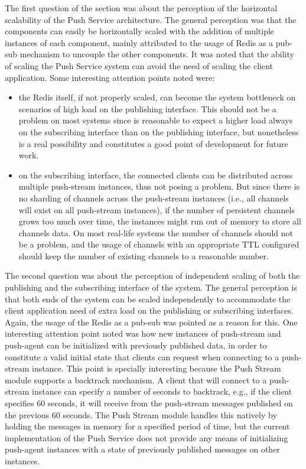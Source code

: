 The first question of the section was about the perception of the horizontal scalability of the Push Service architecture. The general perception was that the components can easily be horizontally scaled with the addition of multiple instances of each component, mainly attributed to the usage of Redis as a pub-sub mechanism to uncouple the other components. It was noted that the ability of scaling the Push Service system can avoid the need of scaling the client application. Some interesting attention points noted were:
\begin{itemize}
    \item the Redis itself, if not properly scaled, can become the system bottleneck on scenarios of high load on the publishing interface. This should not be a problem on most systems since is reasonable to expect a higher load always on the subscribing interface than on the publishing interface, but nonetheless is a real possibility and constitutes a good point of development for future work.
    \item on the subscribing interface, the connected clients can be distributed across multiple push-stream instances, thus not posing a problem. But since there is no sharding of channels across the push-stream instances (i.e., all channels will exist on all push-stream instances), if the number of persistent channels grows too much over time, the instances might run out of memory to store all channels data. On most real-life systems the number of channels should not be a problem, and the usage of channels with an appropriate TTL configured should keep the number of existing channels to a reasonable number.
\end{itemize}

The second question was about the perception of independent scaling of both the publishing and the subscribing interface of the system. The general perception is that both ends of the system can be scaled independently to accommodate the client application need of extra load on the publishing or subscribing interfaces. Again, the usage of the Redis as a pub-sub was pointed as a reason for this. One interesting attention point noted was how new instances of push-stream and push-agent can be initialized with previously published data, in order to constitute a valid initial state that clients can request when connecting to a push-stream instance. This point is specially interesting because the Push Stream module supports a backtrack mechanism. A client that will connect to a push-stream instance can specify a number of seconds to backtrack, e.g., if the client specifies 60 seconds, it will receive from the push-stream messages published on the previous 60 seconds. The Push Stream module handles this natively by holding the messages in memory for a specified period of time, but the current implementation of the Push Service does not provide any means of initializing push-agent instances with a state of previously published messages on other instances.


